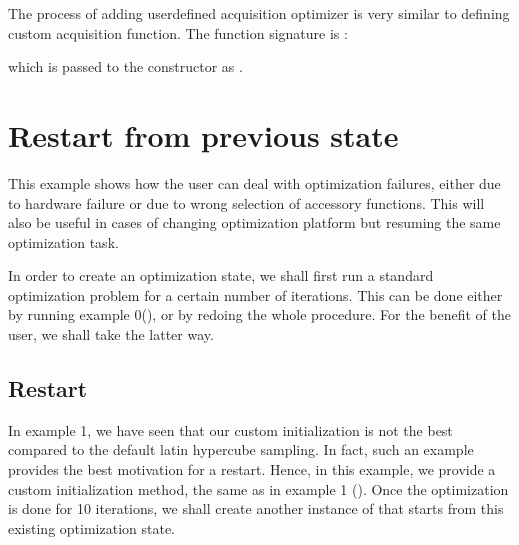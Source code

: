 \documentclass[letterpaper,12pt,english]{sphinxmanual}
\begin{document}
\sphinxAtStartPar
The process of adding user\sphinxhyphen{}defined acquisition optimizer is very similar to defining custom acquisition function. The
function signature is :

\begin{sphinxVerbatim}[commandchars=\\\{\}]
  \PYG{p}{[}\PYG{p}{[}\PYG{p}{]} \PYG{p}{]}        
\end{sphinxVerbatim}

\sphinxAtStartPar
which is passed to the constructor as .


\section{Restart from previous state}
\label{\detokenize{examples/restart_example:restart-from-previous-state}}\label{\detokenize{examples/restart_example:example-2}}\label{\detokenize{examples/restart_example::doc}}
\sphinxAtStartPar
This example shows how the user can deal with optimization failures, either due to hardware failure or due to wrong
selection of accessory functions. This will also be useful in cases of changing optimization platform but resuming the
same optimization task.

\sphinxAtStartPar
In order to create an optimization state, we shall first run a standard optimization problem for a certain number of
iterations. This can be done either by running example 0({\hyperref[\detokenize{examples/getting_started_example:example-0}]{}}), or by re\sphinxhyphen{}doing the whole procedure. For the benefit
of the user, we shall take the latter way.


\subsection{Restart}
\label{\detokenize{examples/restart_example:restart}}
\sphinxAtStartPar
In example 1, we have seen that our custom initialization is not the best compared to the default latin hypercube
sampling. In fact, such an example provides the best motivation for a restart. Hence, in this example, we provide
a custom initialization method, the same as in example 1 ({\hyperref[\detokenize{examples/user_defined_function_example:example-1}]{}}). Once the optimization is done for 10
iterations, we shall create another instance of  that starts from this existing optimization state.
\end{document}
